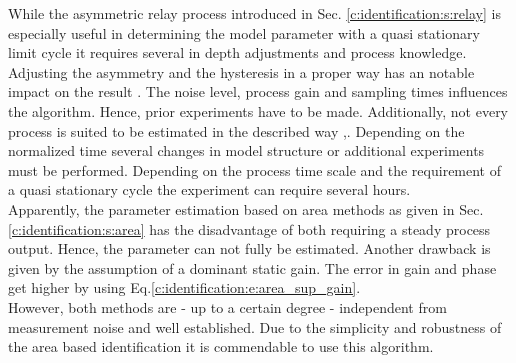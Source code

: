 While the asymmetric relay process introduced in Sec. \ref{c:identification:s:relay} is especially useful in determining the model parameter with a quasi stationary limit cycle it requires several in depth adjustments and process knowledge. Adjusting the asymmetry and the hysteresis in a proper way has an notable impact on the result \cite{Berner2016a}. The noise level, process gain and sampling times influences the algorithm. Hence, prior experiments have to be made. Additionally, not every process is suited to be estimated in the described way \cite{Berner2016a},\cite{Berner2015}. Depending on the normalized time several changes in model structure or additional experiments must be performed. Depending on the process time scale and the requirement of a quasi stationary cycle the experiment can require several hours.\\

Apparently, the parameter estimation based on area methods as given in Sec.\ref{c:identification:s:area} has the disadvantage of both requiring a steady process output. Hence, the parameter can not fully be estimated. Another drawback is given by the assumption of a dominant static gain. The error in gain and phase get higher by using Eq.\ref{c:identification:e:area_sup_gain}.\\

However, both methods are - up to a certain degree - independent from measurement noise and well established. Due to the simplicity and robustness of the area based identification it is commendable to use this algorithm. 
